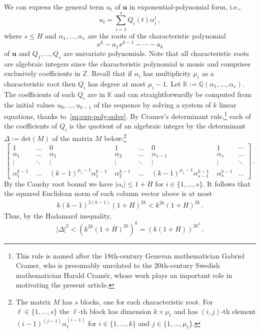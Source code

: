 \documentclass[preprint,12pt]{elsarticle}
\begin{document}
We can express the general term $u_t$ of
$\mathbf{u}$ in exponential-polynomial form, i.e.,
\begin{equation}
  \label{eq:exp-poly-solve}
u_t=\sum_{i=1}^s Q_i(t) \alpha_i^t \, ,
\end{equation}
where $s \leq H$ and $\alpha_1,\ldots,\alpha_s$ are the roots of the characteristic
polynomial
\[ x^k - a_1x^{k-1} - \cdots - a_k \]
of $\mathbf u$ and $Q_1,\ldots,Q_s$ are
univariate polynomials. Note that all characteristic roots are
algebraic integers since the characteristic polynomial is monic and
comprises exclusively coefficients in $\mathbb{Z}$.
Recall that if $\alpha_i$ has multiplicity $\mu_i$ as a
characteristic root then $Q_i$ has degree at most
$\mu_i -1$. Let
${\mathbb K}:={\mathbb Q}(\alpha_1,\ldots,\alpha_s)$.  The
coefficients of each $Q_i$ are in $\mathbb{K}$ and can
straightforwardly be computed
from the initial values $u_0,\ldots,u_{k-1}$ of the sequence by
solving a system of $k$ linear equations, thanks to~\eqref{eq:exp-poly-solve}.
By Cramer's determinant
rule,\footnote{This rule is named after the 18th-century Genevan
  mathematician Gabriel Cramer, who is presumably unrelated to the
  20th-century Swedish mathematician Harald Cram\'er, whose work plays
  an important role in motivating the present article.}
each of the coefficients of $Q_i$ is the quotient of an
algebraic integer by the determinant $\Delta := \mathrm{det}(M)$ of
the matrix $M$ below:\footnote{The matrix
$M$ has $s$ blocks, one for each characteristic root. For $\ell \in \{1,\ldots,s\}$ the
  $\ell$-th block has dimension $k\times \mu_{\ell}$ and has $(i,j)$-th
  element $(i-1)^{(j-1)} \alpha_{\ell}^{(i-1)}$ for $i \in \{1,\ldots,k\}$
and  $j \in \{1,\ldots,\mu_\ell\}$.}
\[
\begin{bmatrix} 1 & \ldots & 0 & 1 & \ldots & 0 & 1 & \cdots\\
\alpha_1 & \ldots & \alpha_1 & \alpha_2 & \ldots & \alpha_{s-1} & \alpha_s & \ldots\\
\vdots & \ddots & \vdots & \vdots & \ddots & \vdots & \vdots & \ddots\\
\alpha_1^{k-1} \; & \ldots \; & (k-1)^{\mu_1-1} \alpha_1^{k-1} \; &
\alpha_2^{k-1} \; & \ldots \; & (k-1)^{\mu_s-1} \alpha_{s-1}^{k-1} \; &
\alpha_s^{k-1} &\ldots \end{bmatrix} \, .
\]
By the Cauchy root bound we have 
$|\alpha_i|\leq 1+H$ for $i\in\{1,\ldots,s\}$.  It follows that
the squared Euclidean norm of each column vector above is at most 
\begin{gather*}
{k(k-1)^{2(k-1)} (1+H)^{2k}}<k^{2k} (1+H)^{2k}\, .
\end{gather*}
Thus, by the Hadamard inequality,
\[|\Delta|^2<(k^{2k} (1+H)^{2k})^k=(k(1+ H))^{2k^2} \, .\]
\end{document}
